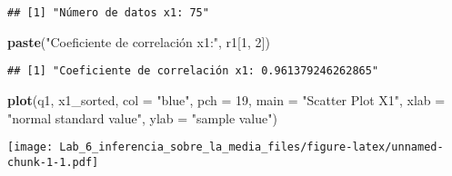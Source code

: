\documentclass[
]{article}
\newenvironment{Shaded}{\begin{snugshade}}{\end{snugshade}}
\newcommand{\AttributeTok}[1]{\textcolor[rgb]{0.13,0.29,0.53}{#1}}
\newcommand{\DecValTok}[1]{\textcolor[rgb]{0.00,0.00,0.81}{#1}}
\newcommand{\FunctionTok}[1]{\textcolor[rgb]{0.13,0.29,0.53}{\textbf{#1}}}
\newcommand{\NormalTok}[1]{#1}
\newcommand{\StringTok}[1]{\textcolor[rgb]{0.31,0.60,0.02}{#1}}
\begin{document}
\begin{verbatim}
## [1] "Número de datos x1: 75"
\end{verbatim}

\begin{Shaded}
\begin{Highlighting}[]
\FunctionTok{paste}\NormalTok{(}\StringTok{"Coeficiente de correlación x1:"}\NormalTok{, r1[}\DecValTok{1}\NormalTok{, }\DecValTok{2}\NormalTok{])}
\end{Highlighting}
\end{Shaded}

\begin{verbatim}
## [1] "Coeficiente de correlación x1: 0.961379246262865"
\end{verbatim}

\begin{Shaded}
\begin{Highlighting}[]
\FunctionTok{plot}\NormalTok{(q1, x1\_sorted, }\AttributeTok{col =} \StringTok{"blue"}\NormalTok{, }\AttributeTok{pch =} \DecValTok{19}\NormalTok{, }\AttributeTok{main =} \StringTok{"Scatter Plot X1"}\NormalTok{, }\AttributeTok{xlab =} \StringTok{"normal standard value"}\NormalTok{, }\AttributeTok{ylab =} \StringTok{"sample value"}\NormalTok{)}
\end{Highlighting}
\end{Shaded}

\texttt{[image: Lab\_6\_inferencia\_sobre\_la\_media\_files/figure-latex/unnamed-chunk-1-1.pdf]}
\end{document}
